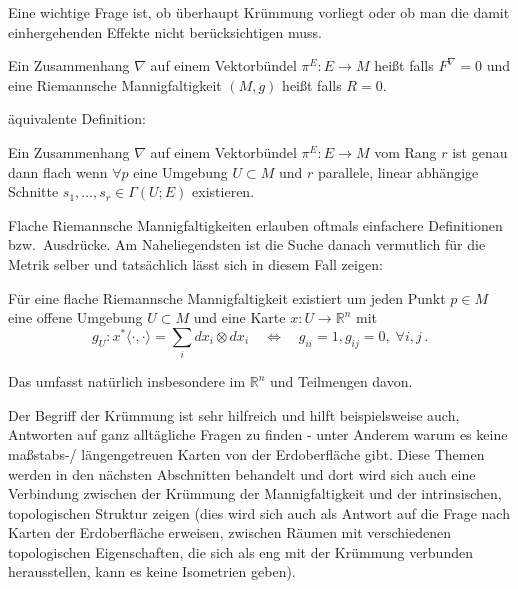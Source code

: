 \documentclass[../H_Analysis_main.tex]{subfiles}
\begin{document}
Eine wichtige Frage ist, ob überhaupt Krümmung vorliegt oder ob man die damit einhergehenden Effekte nicht berücksichtigen muss.

\begin{defi}[Flachheit]
Ein Zusammenhang $\nabla$ auf einem Vektorbündel $\pi^E: E \rightarrow M$ heißt  falls $F^\nabla = 0$ und eine Riemannsche Mannigfaltigkeit $(M, g)$ heißt  falls $R = 0$.
\end{defi}

äquivalente Definition:
\begin{satz}[Flachheit]
Ein Zusammenhang $\nabla$ auf einem Vektorbündel $\pi^E: E \rightarrow M$ vom Rang $r$ ist genau dann flach wenn $\forall p$ eine Umgebung $U \subset M$ und $r$ parallele, linear abhängige Schnitte $s_1, \dots, s_r \in \Gamma(U; E)$ existieren.
\end{satz}

Flache Riemannsche Mannigfaltigkeiten erlauben oftmals einfachere Definitionen bzw.~Ausdrücke. Am Naheliegendsten ist die Suche danach vermutlich für die Metrik selber und tatsächlich lässt sich in diesem Fall zeigen:

\begin{cor}
Für eine flache Riemannsche Mannigfaltigkeit existiert um jeden Punkt $p \in M$ eine offene Umgebung $U \subset M$ und eine Karte $x: U \rightarrow \mathbb{R}^n$ mit
\begin{equation}
g_U: x^* \langle \cdot, \cdot \rangle = \sum_i dx_i \otimes dx_i \quad \Leftrightarrow \quad g_{ii} = 1, g_{ij} = 0, \; \forall i, j \, .
\end{equation}
\end{cor}
Das umfasst natürlich insbesondere im $\mathbb{R}^n$ und Teilmengen davon.


Der Begriff der Krümmung ist sehr hilfreich und hilft beispielsweise auch, Antworten auf ganz alltägliche Fragen zu finden - unter Anderem warum es keine maßstabs-/ längengetreuen Karten von der Erdoberfläche gibt. Diese Themen werden in den nächsten Abschnitten behandelt und dort wird sich auch eine Verbindung zwischen der Krümmung der Mannigfaltigkeit und der intrinsischen, topologischen Struktur zeigen (dies wird sich auch als Antwort auf die Frage nach Karten der Erdoberfläche erweisen, zwischen Räumen mit verschiedenen topologischen Eigenschaften, die sich als eng mit der Krümmung verbunden herausstellen, kann es keine Isometrien geben).
\end{document}
